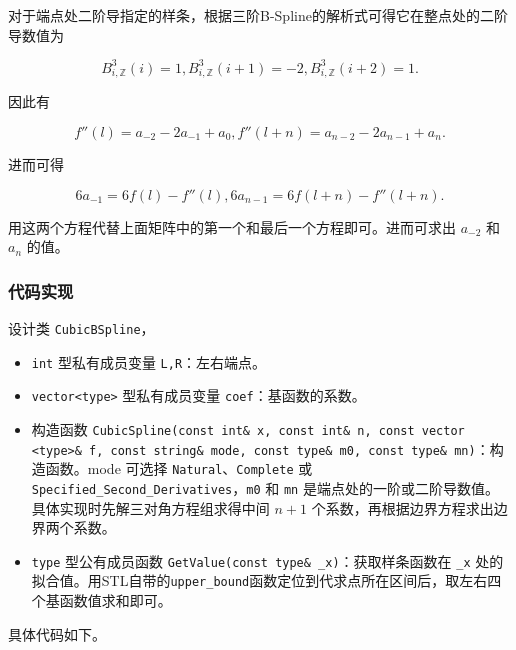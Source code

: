 \documentclass{ctexart}
\begin{document}
对于端点处二阶导指定的样条，根据三阶B-Spline的解析式可得它在整点处的二阶导数值为

\begin{equation}
B_{i,\mathbb{Z}}^3(i)=1,B_{i,\mathbb{Z}}^3(i+1)=-2,B_{i,\mathbb{Z}}^3(i+2)=1.
\end{equation}

因此有

\begin{equation}
f''(l)=a_{-2}-2a_{-1}+a_0,f''(l+n)=a_{n-2}-2a_{n-1}+a_n.
\end{equation}

进而可得

\begin{equation}
6a_{-1}=6f(l)-f''(l),6a_{n-1}=6f(l+n)-f''(l+n).
\end{equation}

用这两个方程代替上面矩阵中的第一个和最后一个方程即可。进而可求出 $a_{-2}$ 和 $a_n$ 的值。

\subsubsection{代码实现}

设计类 \verb|CubicBSpline|，

\begin{itemize}
\item \verb|int| 型私有成员变量 \verb|L,R|：左右端点。
\item \verb|vector<type>| 型私有成员变量 \verb|coef|：基函数的系数。
\item 构造函数 \verb|CubicSpline(const int& x, const int& n, const vector <type>& f, const string& mode, const type& m0, const type& mn)|：构造函数。mode 可选择 \verb|Natural|、\verb|Complete| 或 \verb|Specified_Second_Derivatives|，\verb|m0| 和 \verb|mn| 是端点处的一阶或二阶导数值。具体实现时先解三对角方程组求得中间 $n+1$ 个系数，再根据边界方程求出边界两个系数。
\item \verb|type| 型公有成员函数 \verb|GetValue(const type& _x)|：获取样条函数在 \verb|_x| 处的拟合值。用STL自带的\verb|upper_bound|函数定位到代求点所在区间后，取左右四个基函数值求和即可。
\end{itemize}

具体代码如下。
\end{document}
